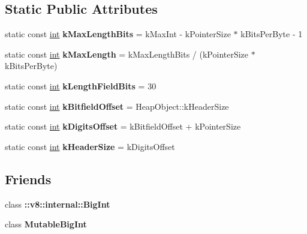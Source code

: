 \subsection*{Static Public Attributes}
\begin{DoxyCompactItemize}
\item 
\mbox{\label{classv8_1_1internal_1_1BigIntBase_add1f8c646b2fb78ca6e5a2cdc3402863}} 
static const \mbox{\hyperlink{classint}{int}} {\bfseries k\+Max\+Length\+Bits} = k\+Max\+Int -\/ k\+Pointer\+Size $\ast$ k\+Bits\+Per\+Byte -\/ 1
\item 
\mbox{\label{classv8_1_1internal_1_1BigIntBase_a767057ea1a716061139729ebf700364b}} 
static const \mbox{\hyperlink{classint}{int}} {\bfseries k\+Max\+Length} = k\+Max\+Length\+Bits / (k\+Pointer\+Size $\ast$ k\+Bits\+Per\+Byte)
\item 
\mbox{\label{classv8_1_1internal_1_1BigIntBase_a1976a48e4f5d807723e5cdca7643720e}} 
static const \mbox{\hyperlink{classint}{int}} {\bfseries k\+Length\+Field\+Bits} = 30
\item 
\mbox{\label{classv8_1_1internal_1_1BigIntBase_aaf5af2e75773d224c9a875c4558061f2}} 
static const \mbox{\hyperlink{classint}{int}} {\bfseries k\+Bitfield\+Offset} = Heap\+Object\+::k\+Header\+Size
\item 
\mbox{\label{classv8_1_1internal_1_1BigIntBase_a25344da305756c81f98ea88d958b61a4}} 
static const \mbox{\hyperlink{classint}{int}} {\bfseries k\+Digits\+Offset} = k\+Bitfield\+Offset + k\+Pointer\+Size
\item 
\mbox{\label{classv8_1_1internal_1_1BigIntBase_aca984448e6370ec67beab030e79bb06e}} 
static const \mbox{\hyperlink{classint}{int}} {\bfseries k\+Header\+Size} = k\+Digits\+Offset
\end{DoxyCompactItemize}
\subsection*{Friends}
\begin{DoxyCompactItemize}
\item 
\mbox{\label{classv8_1_1internal_1_1BigIntBase_aff3b291dd1446db56aa682a943b4d2e3}} 
class {\bfseries \+::v8\+::internal\+::\+Big\+Int}
\item 
\mbox{\label{classv8_1_1internal_1_1BigIntBase_a7f815bd8712ef8864bfc57d18e85e032}} 
class {\bfseries Mutable\+Big\+Int}
\end{DoxyCompactItemize}
